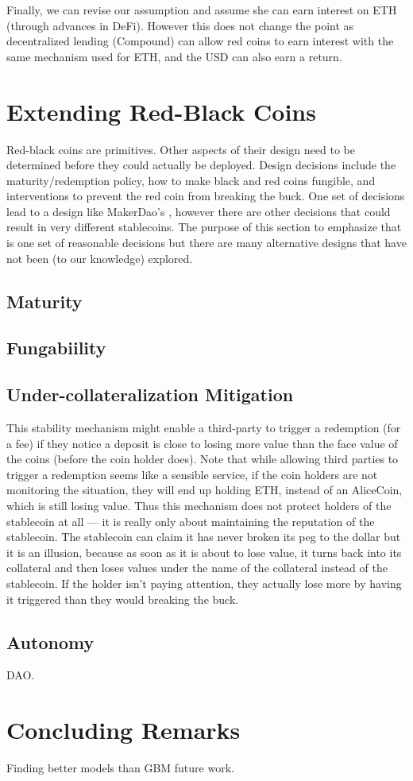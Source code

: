 Finally, we can revise our assumption and assume she can earn interest on ETH (through advances in DeFi). However this does not change the point as decentralized lending (\eg Compound) can allow red coins to earn interest with the same mechanism used for ETH, and the USD can also earn a return.

\section{Extending Red-Black Coins}

Red-black coins are primitives. Other aspects of their design need to be determined before they could actually be deployed. Design decisions include the maturity/redemption policy, how to make black and red coins fungible, and interventions to prevent the red coin from breaking the buck. One set of decisions lead to a design like MakerDao's \dai, however there are other decisions that could result in very different stablecoins. The purpose of this section to emphasize that \dai is one set of reasonable decisions but there are many alternative designs that have not been (to our knowledge) explored.

\subsection{Maturity}

\subsection{Fungabiility}

\subsection{Under-collateralization Mitigation}

This stability mechanism might enable a third-party to trigger a redemption (for a fee) if they notice a deposit is close to losing more value than the face value of the coins (before the coin holder does). Note that while allowing third parties to trigger a redemption seems like a sensible service, if the coin holders are not monitoring the situation, they will end up holding ETH, instead of an AliceCoin, which is still losing value. Thus this mechanism does not protect holders of the stablecoin at all --- it is really only about maintaining the reputation of the stablecoin. The stablecoin can claim it has never broken its peg to the dollar but it is an illusion, because as soon as it is about to lose value, it turns back into its collateral and then loses values under the name of the collateral instead of the stablecoin. If the holder isn’t paying attention, they actually lose more by having it triggered than they would breaking the buck.

\subsection{Autonomy} 

DAO.
 
 



\section{Concluding Remarks}

Finding better models than GBM future work. 